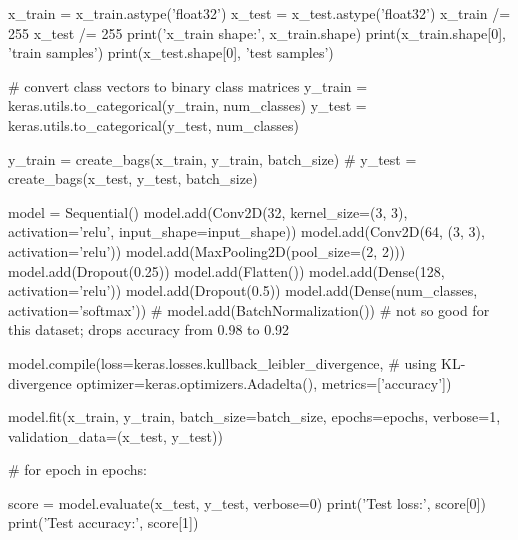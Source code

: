 \documentclass[12pt,a4paper]{article}
\begin{document}
\begin{codeframe}
x_train = x_train.astype('float32')
x_test = x_test.astype('float32')
x_train /= 255
x_test /= 255
print('x_train shape:', x_train.shape)
print(x_train.shape[0], 'train samples')
print(x_test.shape[0], 'test samples')

# convert class vectors to binary class matrices
y_train = keras.utils.to_categorical(y_train, num_classes)
y_test = keras.utils.to_categorical(y_test, num_classes)

y_train = create_bags(x_train, y_train, batch_size)
# y_test = create_bags(x_test, y_test, batch_size)

model = Sequential()
model.add(Conv2D(32, kernel_size=(3, 3),
                 activation='relu',
                 input_shape=input_shape))
model.add(Conv2D(64, (3, 3), activation='relu'))
model.add(MaxPooling2D(pool_size=(2, 2)))
model.add(Dropout(0.25))
model.add(Flatten())
model.add(Dense(128, activation='relu'))
model.add(Dropout(0.5))
model.add(Dense(num_classes, activation='softmax'))
# model.add(BatchNormalization()) # not so good for this dataset; drops accuracy from 0.98 to 0.92

model.compile(loss=keras.losses.kullback_leibler_divergence, # using KL-divergence
              optimizer=keras.optimizers.Adadelta(),
              metrics=['accuracy'])

model.fit(x_train, y_train,
          batch_size=batch_size,
          epochs=epochs,
          verbose=1,
          validation_data=(x_test, y_test))

# for epoch in epochs:



score = model.evaluate(x_test, y_test, verbose=0)
print('Test loss:', score[0])
print('Test accuracy:', score[1])
\end{codeframe}
\end{document}
